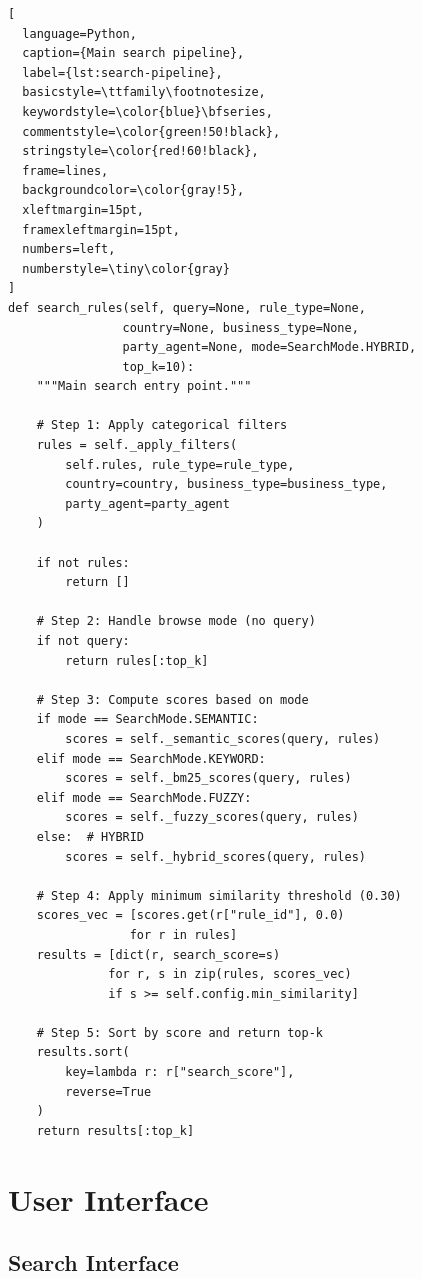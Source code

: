 \begin{lstlisting}[
  language=Python, 
  caption={Main search pipeline}, 
  label={lst:search-pipeline},
  basicstyle=\ttfamily\footnotesize,
  keywordstyle=\color{blue}\bfseries,
  commentstyle=\color{green!50!black},
  stringstyle=\color{red!60!black},
  frame=lines,
  backgroundcolor=\color{gray!5},
  xleftmargin=15pt,
  framexleftmargin=15pt,
  numbers=left,
  numberstyle=\tiny\color{gray}
]
def search_rules(self, query=None, rule_type=None, 
                country=None, business_type=None, 
                party_agent=None, mode=SearchMode.HYBRID, 
                top_k=10):
    """Main search entry point."""
    
    # Step 1: Apply categorical filters
    rules = self._apply_filters(
        self.rules, rule_type=rule_type, 
        country=country, business_type=business_type, 
        party_agent=party_agent
    )
    
    if not rules:
        return []
    
    # Step 2: Handle browse mode (no query)
    if not query:
        return rules[:top_k]
    
    # Step 3: Compute scores based on mode
    if mode == SearchMode.SEMANTIC:
        scores = self._semantic_scores(query, rules)
    elif mode == SearchMode.KEYWORD:
        scores = self._bm25_scores(query, rules)
    elif mode == SearchMode.FUZZY:
        scores = self._fuzzy_scores(query, rules)
    else:  # HYBRID
        scores = self._hybrid_scores(query, rules)
    
    # Step 4: Apply minimum similarity threshold (0.30)
    scores_vec = [scores.get(r["rule_id"], 0.0) 
                 for r in rules]
    results = [dict(r, search_score=s) 
              for r, s in zip(rules, scores_vec)
              if s >= self.config.min_similarity]
    
    # Step 5: Sort by score and return top-k
    results.sort(
        key=lambda r: r["search_score"], 
        reverse=True
    )
    return results[:top_k]
\end{lstlisting}

\section{User Interface}

\subsection{Search Interface}

